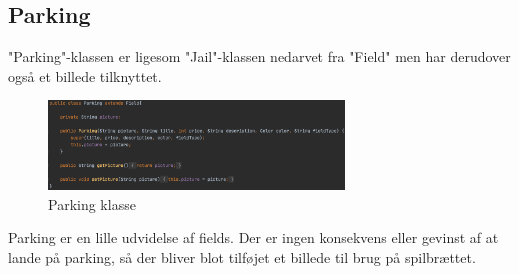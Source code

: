 \subsection{Parking}
"Parking"-klassen er ligesom "Jail"-klassen nedarvet fra "Field" men har derudover også et billede tilknyttet.

\begin{figure}[H]
    \centering
    \includegraphics[width=0.7\textwidth]{sources/7_implementering/Parking.png}
    \caption{Parking klasse}
    \label{fig:Parking}
\end{figure}
Parking er en lille udvidelse af fields. Der er ingen konsekvens eller gevinst af at lande på parking, så der bliver blot tilføjet et billede til brug på spilbrættet.